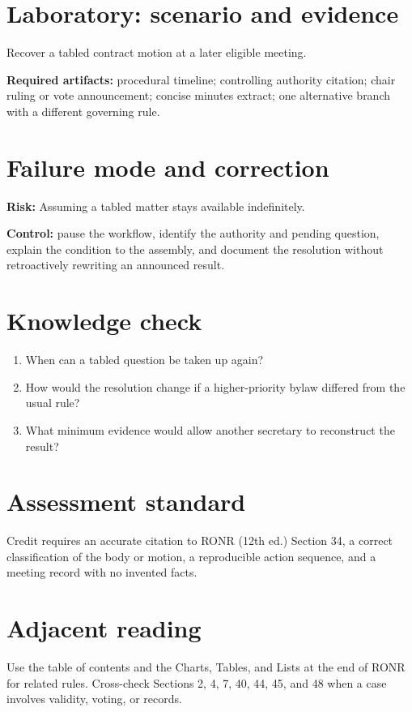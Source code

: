 \documentclass[11pt]{article}
\begin{document}
\section{Laboratory: scenario and evidence}
Recover a tabled contract motion at a later eligible meeting.

\textbf{Required artifacts:} procedural timeline; controlling authority citation; chair ruling or vote announcement; concise minutes extract; one alternative branch with a different governing rule.

\section{Failure mode and correction}
\textbf{Risk:} Assuming a tabled matter stays available indefinitely.

\textbf{Control:} pause the workflow, identify the authority and pending question, explain the condition to the assembly, and document the resolution without retroactively rewriting an announced result.

\section{Knowledge check}
\begin{enumerate}[leftmargin=*,itemsep=4pt]
\item When can a tabled question be taken up again?
\item How would the resolution change if a higher-priority bylaw differed from the usual rule?
\item What minimum evidence would allow another secretary to reconstruct the result?
\end{enumerate}

\section{Assessment standard}
Credit requires an accurate citation to RONR (12th ed.) Section 34, a correct classification of the body or motion, a reproducible action sequence, and a meeting record with no invented facts.

\section{Adjacent reading}
Use the table of contents and the Charts, Tables, and Lists at the end of RONR for related rules. Cross-check Sections 2, 4, 7, 40, 44, 45, and 48 when a case involves validity, voting, or records.
\end{document}
